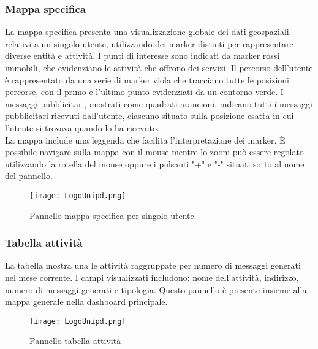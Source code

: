 \documentclass[10pt]{article}
\begin{document}
\begin{justify}
    \subsubsection{Mappa specifica}
    La mappa specifica presenta una visualizzazione globale dei dati geospaziali relativi a un singolo utente, utilizzando dei marker distinti per rappresentare diverse entità e attività. I punti di interesse sono indicati da marker rossi immobili, che evidenziano le attività che offrono dei servizi. Il percorso dell'utente è rappresentato da una serie di marker viola che tracciano tutte le posizioni percorse, con il primo e l'ultimo punto evidenziati da un contorno verde. I messaggi pubblicitari, mostrati come quadrati arancioni, indicano tutti i messaggi pubblicitari ricevuti dall'utente, ciascuno situato sulla posizione esatta in cui l'utente si trovava quando lo ha ricevuto.\\
    La mappa include una leggenda che facilita l'interpretazione dei marker. È possibile navigare sulla mappa con il mouse mentre lo zoom può essere regolato utilizzando la rotella del mouse oppure i pulsanti "+" e "-" situati sotto al nome del pannello.
    \begin{figure}[H]
    \centering
    \texttt{[image: LogoUnipd.png]}
    \caption{Pannello mappa specifica per singolo utente}
    \end{figure}

    \subsubsection{Tabella attività}
    La tabella mostra una le attività raggruppate per numero di messaggi generati nel mese corrente. I campi visualizzati includono: nome dell'attività, indirizzo, numero di messaggi generati e tipologia. Questo pannello è presente insieme alla mappa generale nella dashboard principale.
    \begin{figure}[H]
    \centering
    \texttt{[image: LogoUnipd.png]}
    \caption{Pannello tabella attività}
    \end{figure}




\end{justify}
\end{document}
